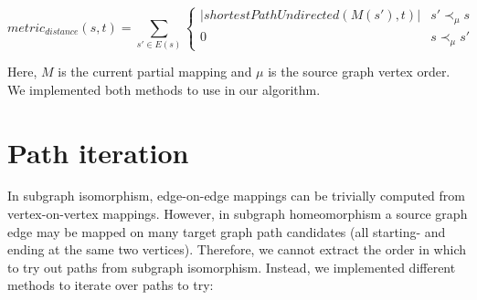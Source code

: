 $$\mathit{metric}_\mathit{distance}(s, t)=\sum_{s' \in E(s)} \begin{cases}
|\mathit{shortestPathUndirected}(M(s'), t)| & s' \prec_\mu s\\
0 & s \prec_\mu s'
\end{cases}$$

Here, $M$ is the current partial mapping and $\mu$ is the source graph vertex order. We implemented both methods to use in our algorithm.

\section{Path iteration}
\label{sec:pathIterationShort}
In subgraph isomorphism, edge-on-edge mappings can be trivially computed from vertex-on-vertex mappings. However, in subgraph homeomorphism a source graph edge may be mapped on many target graph path candidates (all starting- and ending at the same two vertices). Therefore, we cannot extract the order in which to try out paths from subgraph isomorphism. Instead, we implemented different methods to iterate over paths to try:


